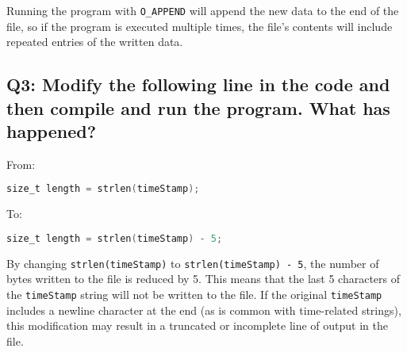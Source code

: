 \documentclass{article}
\begin{document}
Running the program with \texttt{O\_APPEND} will append the new data to the end of the file, so if the program is executed multiple times, the file's contents will include repeated entries of the written data.

\subsection*{Q3: Modify the following line in the code and then compile and run the program. What has happened?}

From:
\begin{lstlisting}[language=C]
size_t length = strlen(timeStamp);
\end{lstlisting}

To:
\begin{lstlisting}[language=C]
size_t length = strlen(timeStamp) - 5;
\end{lstlisting}

By changing \texttt{strlen(timeStamp)} to \texttt{strlen(timeStamp) - 5}, the number of bytes written to the file is reduced by 5. This means that the last 5 characters of the \texttt{timeStamp} string will not be written to the file. If the original \texttt{timeStamp} includes a newline character at the end (as is common with time-related strings), this modification may result in a truncated or incomplete line of output in the file.
\end{document}
